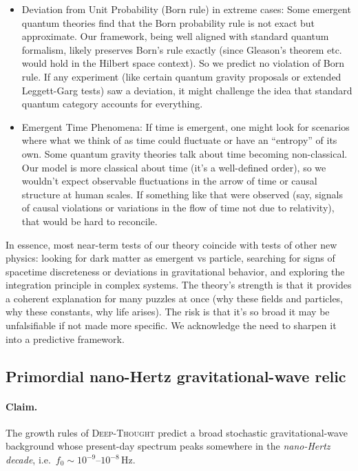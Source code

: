 \documentclass{article}
\begin{document}
\begin{itemize}
\item Deviation from Unit Probability (Born rule) in extreme cases: Some emergent quantum theories find that the Born probability rule is not exact but approximate. Our framework, being well aligned with standard quantum formalism, likely preserves Born’s rule exactly (since Gleason’s theorem etc. would hold in the Hilbert space context). So we predict no violation of Born rule. If any experiment (like certain quantum gravity proposals or extended Leggett-Garg tests) saw a deviation, it might challenge the idea that standard quantum category accounts for everything.
\item Emergent Time Phenomena: If time is emergent, one might look for scenarios where what we think of as time could fluctuate or have an “entropy” of its own. Some quantum gravity theories talk about time becoming non-classical. Our model is more classical about time (it’s a well-defined order), so we wouldn’t expect observable fluctuations in the arrow of time or causal structure at human scales. If something like that were observed (say, signals of causal violations or variations in the flow of time not due to relativity), that would be hard to reconcile.
\end{itemize}

In essence, most near-term tests of our theory coincide with tests of other new physics: looking for dark matter as emergent vs particle, searching for signs of spacetime discreteness or deviations in gravitational behavior, and exploring the integration principle in complex systems. The theory’s strength is that it provides a coherent explanation for many puzzles at once (why these fields and particles, why these constants, why life arises). The risk is that it’s so broad it may be unfalsifiable if not made more specific. We acknowledge the need to sharpen it into a predictive framework.

\subsection{Primordial nano-Hertz gravitational-wave relic}
\label{subsec:nHz_GW}

\paragraph{Claim.}
The growth rules of \textsc{Deep-Thought} predict a broad stochastic
gravitational-wave background whose present-day spectrum peaks somewhere in the
\emph{nano-Hertz decade}, i.e.\ \(f_0 \sim 10^{-9}\text{–}10^{-8}\,\mathrm{Hz}\).
\end{document}
